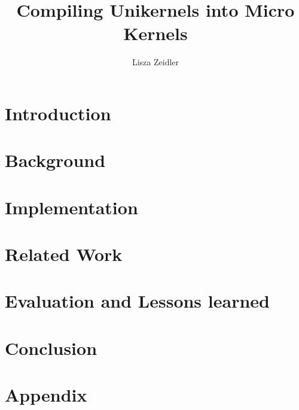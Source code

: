 \documentclass[diplominf]{zihpub}
\author{Lisza Zeidler}
\title{Compiling Unikernels into Micro Kernels}
\begin{document}
\begin{thesisdocument}

\chapter{Introduction}
\label{Chapter:Intro}


\chapter{Background}
\label{Chapter:Background}


\chapter{Implementation}
\label{Chapter:Implementation}


\chapter{Related Work}
\label{Chapter:Related}


\chapter{Evaluation and Lessons learned}
\label{Chapter:Learnings}


\chapter{Conclusion}
\label{Chapter:Discussion}


\cleardoublestandardpage


\cleardoublestandardpage
\listoffigures
\cleardoublestandardpage
{}      
\cleardoublestandardpage
\listoftables


\appendix
\chapter{Appendix}
\label{Appendix}


\end{thesisdocument}
\end{document}
